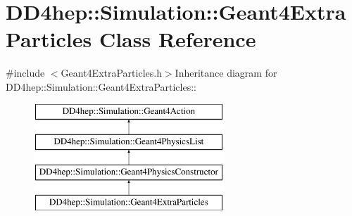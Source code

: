 \hypertarget{class_d_d4hep_1_1_simulation_1_1_geant4_extra_particles}{
\section{DD4hep::Simulation::Geant4ExtraParticles Class Reference}
\label{class_d_d4hep_1_1_simulation_1_1_geant4_extra_particles}
}


{\ttfamily \#include $<$Geant4ExtraParticles.h$>$}Inheritance diagram for DD4hep::Simulation::Geant4ExtraParticles::\begin{figure}[H]
\begin{center}
\leavevmode
\includegraphics[height=4cm]{class_d_d4hep_1_1_simulation_1_1_geant4_extra_particles}
\end{center}
\end{figure}
